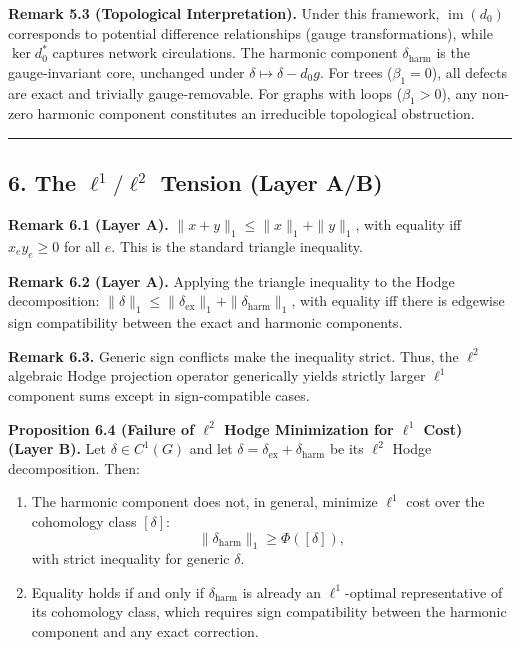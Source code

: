 \documentclass[
]{article}
\begin{document}
\textbf{Remark 5.3 (Topological Interpretation).} Under this framework,
\(\operatorname{im}(d_0)\) corresponds to potential difference
relationships (gauge transformations), while \(\ker d_0^*\) captures
network circulations. The harmonic component \(\delta_{\text{harm}}\) is
the gauge-invariant core, unchanged under
\(\delta \mapsto \delta - d_0 g\). For trees (\(\beta_1 = 0\)), all
defects are exact and trivially gauge-removable. For graphs with loops
(\(\beta_1 > 0\)), any non-zero harmonic component constitutes an
irreducible topological obstruction.

\begin{center}\rule{0.5\linewidth}{0.5pt}\end{center}

\subsection{\texorpdfstring{6. The \(\ell^1 / \ell^2\) Tension
\textbf{(Layer
A/B)}}{6. The \textbackslash ell\^{}1 / \textbackslash ell\^{}2 Tension (Layer A/B)}}\label{the-ell1-ell2-tension-layer-ab}

\textbf{Remark 6.1 (Layer A).} \(\|x + y\|_1 \leq \|x\|_1 + \|y\|_1\),
with equality iff \(x_e y_e \geq 0\) for all \(e\). This is the standard
triangle inequality.

\textbf{Remark 6.2 (Layer A).} Applying the triangle inequality to the
Hodge decomposition:
\(\|\delta\|_1 \leq \|\delta_{\text{ex}}\|_1 + \|\delta_{\text{harm}}\|_1\),
with equality iff there is edgewise sign compatibility between the exact
and harmonic components.

\textbf{Remark 6.3.} Generic sign conflicts make the inequality strict.
Thus, the \(\ell^2\) algebraic Hodge projection operator generically
yields strictly larger \(\ell^1\) component sums except in
sign-compatible cases.

\textbf{Proposition 6.4 (Failure of \(\ell^2\) Hodge Minimization for
\(\ell^1\) Cost) (Layer B).} Let \(\delta \in C^1(G)\) and let
\(\delta = \delta_{\mathrm{ex}} + \delta_{\mathrm{harm}}\) be its
\(\ell^2\) Hodge decomposition. Then:

\begin{enumerate}
\def\labelenumi{\arabic{enumi}.}
\item
  The harmonic component does not, in general, minimize \(\ell^1\) cost
  over the cohomology class \([\delta]\):
  \[\|\delta_{\mathrm{harm}}\|_1 \geq \Phi([\delta]),\] with strict
  inequality for generic \(\delta\).
\item
  Equality holds if and only if \(\delta_{\mathrm{harm}}\) is already an
  \(\ell^1\)-optimal representative of its cohomology class, which
  requires sign compatibility between the harmonic component and any
  exact correction.
\end{enumerate}
\end{document}
